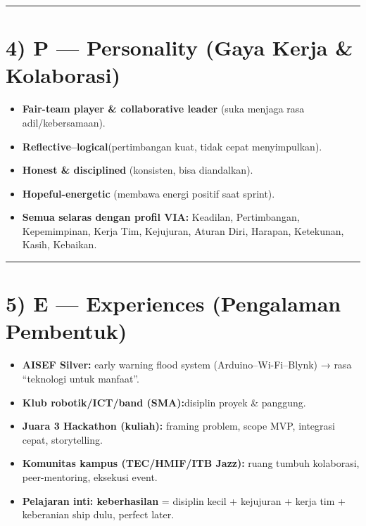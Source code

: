 \documentclass[
  letterpaper,
  DIV=11,
  numbers=noendperiod]{scrreprt}
\begin{document}
\begin{center}\rule{0.5\linewidth}{0.5pt}\end{center}

\section{4) P --- Personality (Gaya Kerja \&
Kolaborasi)}\label{p-personality-gaya-kerja-kolaborasi}

\begin{itemize}
\item
  \textbf{Fair-team player \& collaborative leader} (suka menjaga rasa
  adil/kebersamaan).
\item
  \textbf{Reflective--logical}(pertimbangan kuat, tidak cepat
  menyimpulkan).
\item
  \textbf{Honest \& disciplined} (konsisten, bisa diandalkan).
\item
  \textbf{Hopeful-energetic} (membawa energi positif saat sprint).
\item
  \textbf{Semua selaras dengan profil VIA:} Keadilan, Pertimbangan,
  Kepemimpinan, Kerja Tim, Kejujuran, Aturan Diri, Harapan, Ketekunan,
  Kasih, Kebaikan.
\end{itemize}

\begin{center}\rule{0.5\linewidth}{0.5pt}\end{center}

\section{5) E --- Experiences (Pengalaman
Pembentuk)}\label{e-experiences-pengalaman-pembentuk}

\begin{itemize}
\item
  \textbf{AISEF Silver:} early warning flood system
  (Arduino--Wi-Fi--Blynk) → rasa ``teknologi untuk manfaat''.
\item
  \textbf{Klub robotik/ICT/band (SMA):}disiplin proyek \& panggung.
\item
  \textbf{Juara 3 Hackathon (kuliah):} framing problem, scope MVP,
  integrasi cepat, storytelling.
\item
  \textbf{Komunitas kampus (TEC/HMIF/ITB Jazz):} ruang tumbuh
  kolaborasi, peer-mentoring, eksekusi event.
\item
  \textbf{Pelajaran inti: keberhasilan} = disiplin kecil + kejujuran +
  kerja tim + keberanian ship dulu, perfect later.
\end{itemize}
\end{document}
